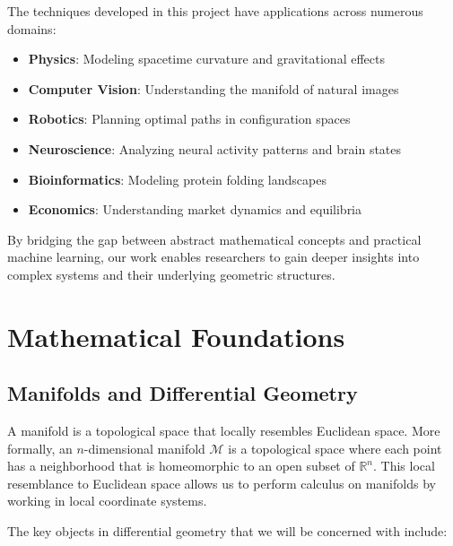 \documentclass[11pt,a4paper]{article}
\newcommand{\R}{\mathbb{R}}
\begin{document}
The techniques developed in this project have applications across numerous domains:

\begin{itemize}
    \item \textbf{Physics}: Modeling spacetime curvature and gravitational effects
    \item \textbf{Computer Vision}: Understanding the manifold of natural images
    \item \textbf{Robotics}: Planning optimal paths in configuration spaces
    \item \textbf{Neuroscience}: Analyzing neural activity patterns and brain states
    \item \textbf{Bioinformatics}: Modeling protein folding landscapes
    \item \textbf{Economics}: Understanding market dynamics and equilibria
\end{itemize}

By bridging the gap between abstract mathematical concepts and practical machine learning, our work enables researchers to gain deeper insights into complex systems and their underlying geometric structures.

\section{Mathematical Foundations}
\subsection{Manifolds and Differential Geometry}

A manifold is a topological space that locally resembles Euclidean space. More formally, an $n$-dimensional manifold $\mathcal{M}$ is a topological space where each point has a neighborhood that is homeomorphic to an open subset of $\R^n$. This local resemblance to Euclidean space allows us to perform calculus on manifolds by working in local coordinate systems.

The key objects in differential geometry that we will be concerned with include:
\end{document}
